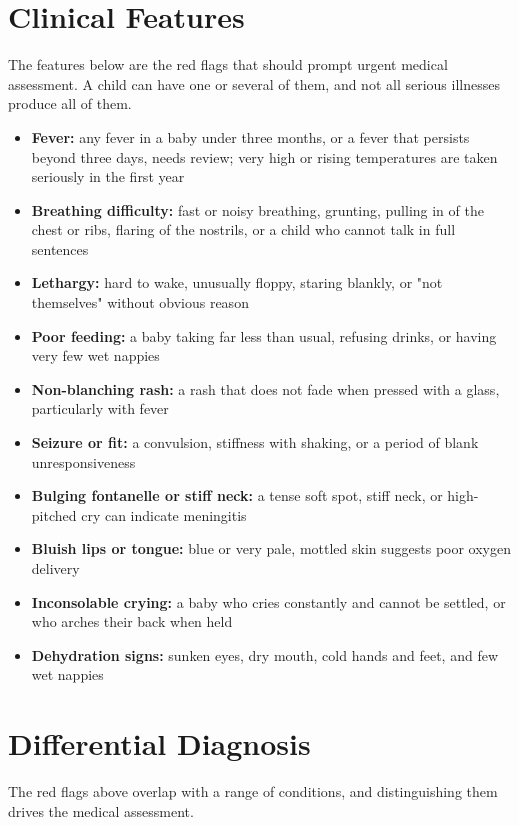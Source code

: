 \section*{Clinical Features}
The features below are the red flags that should prompt urgent medical assessment. A child can have one or several of them, and not all serious illnesses produce all of them.

\begin{itemize}
    \item \textbf{Fever:} any fever in a baby under three months, or a fever that persists beyond three days, needs review; very high or rising temperatures are taken seriously in the first year
    \item \textbf{Breathing difficulty:} fast or noisy breathing, grunting, pulling in of the chest or ribs, flaring of the nostrils, or a child who cannot talk in full sentences
    \item \textbf{Lethargy:} hard to wake, unusually floppy, staring blankly, or "not themselves" without obvious reason
    \item \textbf{Poor feeding:} a baby taking far less than usual, refusing drinks, or having very few wet nappies
    \item \textbf{Non-blanching rash:} a rash that does not fade when pressed with a glass, particularly with fever
    \item \textbf{Seizure or fit:} a convulsion, stiffness with shaking, or a period of blank unresponsiveness
    \item \textbf{Bulging fontanelle or stiff neck:} a tense soft spot, stiff neck, or high-pitched cry can indicate meningitis
    \item \textbf{Bluish lips or tongue:} blue or very pale, mottled skin suggests poor oxygen delivery
    \item \textbf{Inconsolable crying:} a baby who cries constantly and cannot be settled, or who arches their back when held
    \item \textbf{Dehydration signs:} sunken eyes, dry mouth, cold hands and feet, and few wet nappies
\end{itemize}

\section*{Differential Diagnosis}
The red flags above overlap with a range of conditions, and distinguishing them drives the medical assessment.

